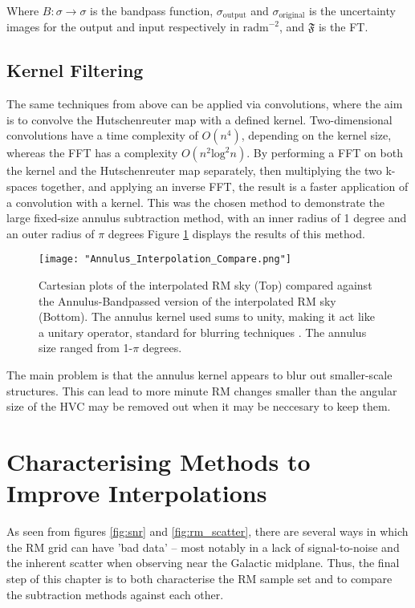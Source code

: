Where $B\colon\sigma\rightarrow\sigma$ is the bandpass function, $\sigma_{\mathrm{output}}$ and $\sigma_{\mathrm{original}}$ is the uncertainty images for the output and input respectively in $\mathrm{rad m}^{-2}$, and $\mathbf{\mathfrak{F}}$ is the FT.

\subsection{Kernel Filtering}
\label{ssec:kernel}

The same techniques from above can be applied via convolutions, where the aim is to convolve the Hutschenreuter map with a defined kernel. Two-dimensional convolutions have a time complexity of $O(n^4)$, depending on the kernel size, whereas the FFT has a complexity $O(n^2 \mathrm{log}^2 n)$. By performing a FFT on both the kernel and the Hutschenreuter map separately, then multiplying the two k-spaces together, and applying an inverse FFT, the result is a faster application of a convolution with a kernel. This was the chosen method to demonstrate the large fixed-size annulus subtraction method, with an inner radius of 1 degree and an outer radius of $\pi$ degrees Figure \ref{fig:annulus_interpolation} displays the results of this method.

\begin{figure}
    \texttt{[image: "Annulus\_Interpolation\_Compare.png"]}
    \centering
    \caption{Cartesian plots of the interpolated RM sky (Top) compared against the Annulus-Bandpassed version of the interpolated RM sky (Bottom). The annulus kernel used sums to unity, making it act like a unitary operator, standard for blurring techniques \citep{ID38}. The annulus size ranged from 1-$\pi$ degrees.}
    \label{fig:annulus_interpolation}
\end{figure}

The main problem is that the annulus kernel appears to blur out smaller-scale structures. This can lead to more minute RM changes smaller than the angular size of the HVC may be removed out when it may be neccesary to keep them.

\section{Characterising Methods to Improve Interpolations}
\label{sec:charm}

As seen from figures \ref{fig:snr} and \ref{fig:rm_scatter}, there are several ways in which the RM grid can have 'bad data' – most notably in a lack of signal-to-noise and the inherent scatter when observing near the Galactic midplane. Thus, the final step of this chapter is to both characterise the RM sample set and to compare the subtraction methods against each other.



